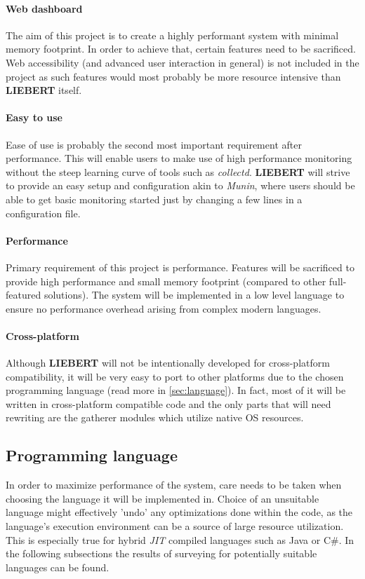             \paragraph{Web dashboard}
                The aim of this project is to create a highly performant system with minimal memory footprint. In order to achieve that, certain features need to be sacrificed. Web accessibility (and advanced user interaction in general) is not included in the project as such features would most probably be more resource intensive than \textbf{LIEBERT} itself.

            \paragraph{Easy to use}
                Ease of use is probably the second most important requirement after performance. This will enable users to make use of high performance monitoring without the steep learning curve of tools such as \textit{collectd}. \textbf{LIEBERT} will strive to provide an easy setup and configuration akin to \textit{Munin}, where users should be able to get basic monitoring started just by changing a few lines in a configuration file.

            \paragraph{Performance}
                Primary requirement of this project is performance. Features will be sacrificed to provide high performance and small memory footprint (compared to other full-featured solutions). The system will be implemented in a low level language to ensure no performance overhead arising from complex modern languages.

            \paragraph{Cross-platform}
                Although \textbf{LIEBERT} will not be intentionally developed for cross-platform compatibility, it will be very easy to port to other platforms due to the chosen programming language (read more in \autoref{sec:language}). In fact, most of it will be written in cross-platform compatible code and the only parts that will need rewriting are the gatherer modules which utilize native OS resources.

    \subsection{Programming language}\label{sec:language}
        In order to maximize performance of the system, care needs to be taken when choosing the language it will be implemented in. Choice of an unsuitable language might effectively 'undo' any optimizations done within the code, as the language's execution environment can be a source of large resource utilization. This is especially true for hybrid \textit{JIT} compiled languages such as Java or C\#. In the following subsections the results of surveying for potentially suitable languages can be found.

